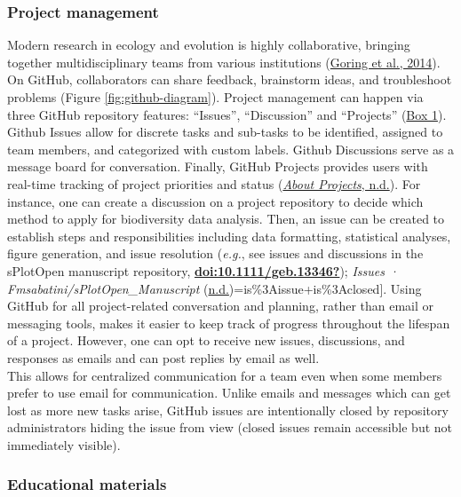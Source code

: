 \hypertarget{project-management}{%
\subsubsection{Project management}\label{project-management}}

Modern research in ecology and evolution is highly collaborative, bringing together multidisciplinary teams from various institutions (\protect\hyperlink{ref-1HhzKAC1K}{Goring et al., 2014}).
On GitHub, collaborators can share feedback, brainstorm ideas, and troubleshoot problems (Figure \ref{fig:github-diagram}).
Project management can happen via three GitHub repository features: ``Issues'', ``Discussion'' and ``Projects'' (\protect\hyperlink{definitions}{Box 1}).
Github Issues allow for discrete tasks and sub-tasks to be identified, assigned to team members, and categorized with custom labels.
Github Discussions serve as a message board for conversation.
Finally, GitHub Projects provides users with real-time tracking of project priorities and status (\protect\hyperlink{ref-RhBKe0MG}{\emph{About Projects}, n.d.}).
For instance, one can create a discussion on a project repository to decide which method to apply for biodiversity data analysis.
Then, an issue can be created to establish steps and responsibilities including data formatting, statistical analyses, figure generation, and issue resolution (\emph{e.g.}, see issues and discussions in the sPlotOpen manuscript repository, \protect\hyperlink{ref-doi:10.1111ux2fgeb.13346}{\textbf{doi:10.1111/geb.13346?}}); \emph{Issues · Fmsabatini/sPlotOpen\_Manuscript} (\protect\hyperlink{ref-3UAritXO}{n.d.})=is\%3Aissue+is\%3Aclosed{]}.
Using GitHub for all project-related conversation and planning, rather than email or messaging tools, makes it easier to keep track of progress throughout the lifespan of a project.
However, one can opt to receive new issues, discussions, and responses as emails and can post replies by email as well.\\
This allows for centralized communication for a team even when some members prefer to use email for communication.
Unlike emails and messages which can get lost as more new tasks arise, GitHub issues are intentionally closed by repository administrators hiding the issue from view (closed issues remain accessible but not immediately visible).

\hypertarget{educational-materials}{%
\subsubsection{Educational materials}\label{educational-materials}}

